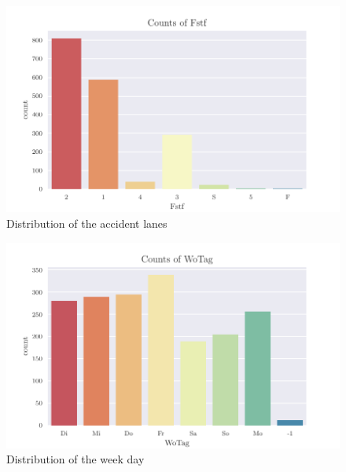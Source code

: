 \documentclass[a4paper,headsepline,footsepline,fontsize=11pt,BCOR=12mm,DIV=12]{report}
\begin{document}
\begin{appendices}
\begin{figure}[h]
	\centering
	\includegraphics[scale=1]{../CorrAnalysis/data/BAYSIS/02_matched/plots/baysis_matched_count_Fstf}
	\caption{Distribution of the accident lanes}
	\label{img:appendix_baysis_matched_Fstf 'Fstf'}
\end{figure}

\begin{figure}[h]
	\centering
	\includegraphics[scale=1]{../CorrAnalysis/data/BAYSIS/02_matched/plots/baysis_matched_count_WoTag}
	\caption{Distribution of the week day}
	\label{img:appendix_baysis_matched_WoTag 'WoTag'}
\end{figure}


\end{appendices}
\end{document}
